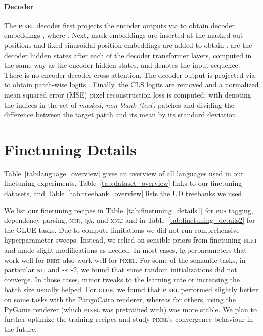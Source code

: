 \documentclass{article}
\newcommand{\model}{\textsc{pixel}\xspace}
\begin{document}
\paragraph{Decoder} The \model decoder first projects the encoder outputs via  to obtain decoder embeddings , where .
Next, mask embeddings  are inserted at the masked-out positions and fixed sinusoidal position embeddings are added to obtain
.  are the decoder hidden states after each of the  decoder transformer layers, computed in the same way as the encoder hidden states, and  denotes the input sequence. There is no encoder-decoder cross-attention. The decoder output  is projected via  to obtain patch-wise logits . Finally, the CLS logits are removed and a normalized mean squared error (MSE) pixel reconstruction loss is computed:  with  denoting the indices in the set of \emph{masked, non-blank (text)} patches  and  dividing the difference between the target patch and its mean by its standard deviation.

\section{Finetuning Details}
\label{app:finetuning_details}
Table~\ref{tab:language_overview} gives an overview of all languages used in our finetuning experiments, Table~\ref{tab:dataset_overview} links to our finetuning datasets, and Table~\ref{tab:treebank_overview} lists the UD treebanks we used.

We list our finetuning recipes in Table~\ref{tab:finetuning_details1} for \textsc{pos} tagging, dependency parsing, \textsc{ner}, \textsc{qa}, and \textsc{xnli} and in Table~\ref{tab:finetuning_details2} for the GLUE tasks. Due to compute limitations we did not run comprehensive hyperparameter sweeps. Instead, we relied on sensible priors from finetuning \textsc{bert} and made slight modifications as needed. In most cases, hyperparameters that work well for \textsc{bert} also work well for \model. For some of the semantic tasks, in particular \textsc{nli} and \textsc{sst-}{\footnotesize2}, we found that some random initializations did not converge. In those cases, minor tweaks to the learning rate or increasing the batch size usually helped. For \textsc{glue}, we found that \model performed slightly better on some tasks with the PangoCairo renderer, whereas for others, using the PyGame renderer (which \model was pretrained with) was more stable. We plan to further optimize the training recipes and study \model's convergence behaviour in the future. 
\end{document}
